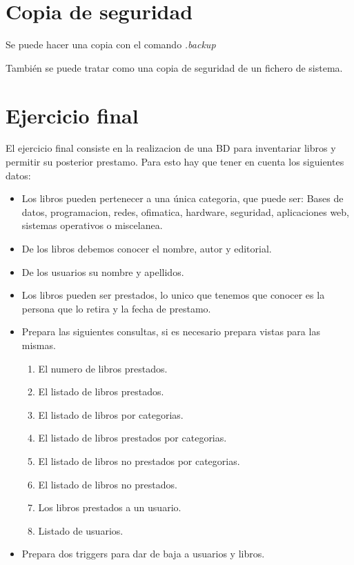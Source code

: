 \documentclass[4paper]{article}
\begin{document}
\section{Copia de seguridad}
Se puede hacer una copia con el comando \emph{.backup}\par 
También se puede tratar como una copia de seguridad de un fichero de sistema.

\section{Ejercicio final}
El ejercicio final consiste en la realizacion de una BD para inventariar libros y permitir su posterior prestamo. Para esto hay que tener en cuenta los siguientes datos:
\begin{itemize}
\item Los libros pueden pertenecer a una única categoria, que puede ser: Bases de datos, programacion, redes, ofimatica, hardware, seguridad, aplicaciones web,  sistemas operativos o miscelanea.
\item De los libros debemos conocer el nombre, autor y editorial.
\item De los usuarios su nombre y apellidos.
\item Los libros pueden ser prestados, lo unico que tenemos que conocer es la persona que lo retira y la fecha de prestamo. 
\item Prepara las siguientes consultas, si es necesario prepara vistas para las mismas.
\begin{enumerate}
\item El numero de libros prestados.
\item El listado de libros prestados.
\item El listado de libros por categorias.
\item El listado de libros prestados por categorias.
\item El listado de libros no prestados por categorias.
\item El listado de libros no prestados.
\item Los libros prestados a un usuario.
\item Listado de usuarios.
\end{enumerate}
\item Prepara dos triggers para dar de baja a usuarios y libros.
\end{itemize}
\end{document}

